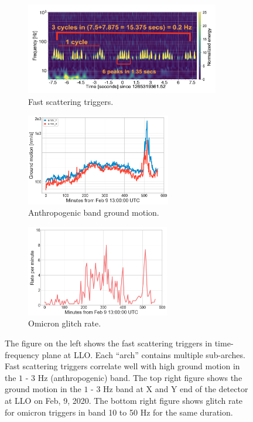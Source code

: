 \documentclass[12pt]{iopart}
\begin{document}
\begin{figure}
\captionsetup[subfigure]{font=scriptsize,labelfont=scriptsize}
   \begin{minipage}{0.5\textwidth}
   \begin{subfigure}[b]{\textwidth}
        \centering
         \includegraphics[width=\textwidth,height=4cm]{fast_scat11.png}
         \caption{Fast scattering triggers.}
         \label{fig:fastscat}
    \end{subfigure}
    \end{minipage}
    \begin{minipage}{0.5\textwidth}
    \begin{subfigure}{\textwidth}
    \includegraphics[width=\textwidth,height=4cm]{anthro_motion1.png}
    \caption{Anthropogenic band ground motion.} \label{subfig:anthro}
    \end{subfigure}

    \vspace*{0.6cm}
    \begin{subfigure}{\textwidth}
    \includegraphics[width=\textwidth,height=4cm]{fast_glitchrate1.png}
    \caption{Omicron glitch rate.} \label{subfig:fast_scat_rate}
    \end{subfigure}
    \end{minipage}
    \caption{The figure on the left shows the fast scattering triggers in time-frequency plane at LLO. Each ``arch'' contains multiple sub-arches. Fast scattering triggers correlate well with high ground motion in the $1$ - $3$ Hz (anthropogenic) band. The top right figure shows the ground motion in the $1$ - $3$ Hz band at X and Y end of the detector at LLO on Feb, 9, 2020. The bottom right figure shows glitch rate for omicron triggers in band 10 to 50 Hz for the same duration. }
    \label{fig:Fast_scattering}

\end{figure}
\end{document}
